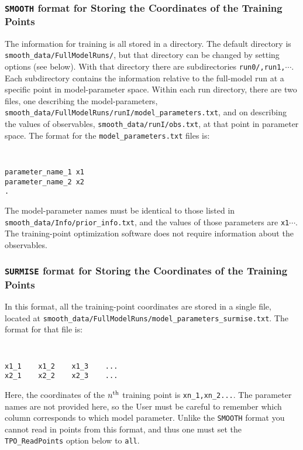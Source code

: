 \documentclass[UserManual.tex]{subfiles}
\begin{document}
\subsubsection{{\tt SMOOTH} format for Storing the Coordinates of the Training Points}
The information for training is all stored in a directory. The default directory is {\tt smooth\_data/FullModelRuns/}, but that directory can be changed by setting options (see below). With that directory there are subdirectories {\tt run0/,run1,}$\cdots$. Each subdirectory contains the information relative to the full-model run at a specific point in model-parameter space. Within each run directory, there are two files, one describing the model-parameters, {\tt smooth\_data/FullModelRuns/runI/model\_parameters.txt}, and on describing the values of observables, {\tt smooth\_data/runI/obs.txt}, at that point in parameter space. The format for the {\tt model\_parameters.txt} files is:
{\tt
\begin{verbatim}
parameter_name_1 x1  
parameter_name_2 x2  
.
\end{verbatim}}
The model-parameter names must be identical to those listed in {\tt smooth\_data/Info/prior\_info.txt}, and the values of those parameters are {\tt x1}$\cdots$. The training-point optimization software does not require information about the observables.

\subsubsection{{\tt SURMISE} format for Storing the Coordinates of the Training Points}
In this format, all the training-point coordinates are stored in a single file, located at {\tt smooth\_data/FullModelRuns/model\_parameters\_surmise.txt}. The format for that file is:
{\tt
\begin{verbatim}
x1_1	x1_2	x1_3	...
x2_1	x2_2	x2_3	...
\end{verbatim}}
Here, the coordinates of the $n^{\rm th}$ training point is {\tt xn\_1,xn\_2...}. The parameter names are not provided here, so the User must be careful to remember which column corresponds to which model parameter. Unlike the {\tt SMOOTH} format you cannot read in points from this format, and thus one must set the {\tt TPO\_ReadPoints} option below to {\tt all}. 
\end{document}
